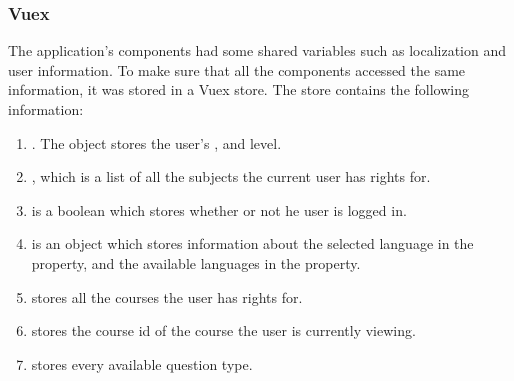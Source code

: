 \subsubsection{Vuex}
The application's components had some shared variables such as localization and user information. To make sure that all the components accessed the same information, it was stored in a Vuex store. The store contains the following information:
\begin{enumerate}
	\item {}. The  object stores the user's ,  and  level.
	\item {}, which is a list of all the subjects the current user has rights for.
	\item {} is a boolean which stores whether or not he user is logged in.
	\item {} is an object which stores information about the selected language in the  property, and the available languages in the  property.
	\item {} stores all the courses the user has rights for.
	\item {} stores the course id of the course the user is currently viewing.
	\item {} stores every available question type.
\end{enumerate}
